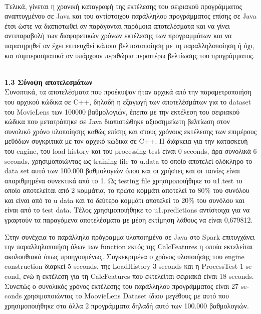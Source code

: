 \documentclass{report}
\begin{document}
\\  Τελικά, γίνεται η χρονική καταγραφή της εκτέλεσης του σειριακού προγράμματος αναπτυγμένου σε \textlatin{Java} και του αντίστοιχου παράλληλου προγράμματος επίσης σε \textlatin{Java} έτσι ώστε να διαπιστωθεί αν παράγονται παρόμοια αποτελέσματα και να γίνει αντιπαραβολή των διαφορετικών χρόνων εκτέλεσης των προγραμμάτων και να παρατηρηθεί αν έχει επιτευχθεί κάποια βελτιστοποίηση με τη παραλληλοποίηση ή όχι, και συμπερασματικά αν υπάρχουν περιθώρια περαιτέρω βελτίωσης του προγράμματος.

\vspace{25mm}
\\
\textbf{\large{1.3 Σύνοψη αποτελεσμάτων}}
\vspace{2mm}
\\
Συνοπτικά, τα αποτελέσματα που προέκυψαν ήταν αρχικά από την παραμετροποιήση του αρχικού κώδικα σε \textlatin{C++}, δηλαδή η εξαγωγή των αποτελέσμάτων για το \textlatin{dataset} του \textlatin{MovieLens} των 100000 βαθμολογιών, έπειτα με την εκτέλεση του σειριακού κώδικα που μετατράπηκε σε \textlatin{Java} διαπιστώθηκε αξιοσημείωτη βελτίωση στον συνολικό χρόνο υλοποίησης καθώς επίσης και στους χρόνους εκτέλεσης των επιμέρους μεθόδων συγκριτικά με τον αρχικό κώδικα σε \textlatin{C++}. Η διάρκεια για την κατασκευή του \textlatin{engine}, του \textlatin{load history} και του \textlatin{processing test}  είναι 0 \textlatin{seconds}, άρα συνολικά 6 \textlatin{seconds}, χρησιμοποιώντας ως \textlatin{training file} το \textlatin{u.data} το οποίο αποτελεί ολόκληρο το \textlatin{data set} αυτό των 100.000 βαθμολογιών όπου και οι χρήστες και οι ταινίες είναι απαριθμημένα συνεκτικά από το 1. Ως  \textlatin{testing file}  χρησιμοποιήθηκε το \textlatin{u1.test} το οποίο αποτελείται από 2 κομμάτια, το πρώτο κομμάτι αποτελεί το 80\% του συνόλου και είναι από το \textlatin{u data} και το δεύτερο κομμάτι αποτελεί το 20\% του συνόλου και είναι από το \textlatin{test data}. Τέλος χρησιμοποιήθηκε το \textlatin{u1.predictions} αντίστοιχα για να γραφτούν τα παραγόμενα αποτελέσματα με μέση εκτίμηση λάθους να είναι 0,679812.

Στην συνέχεια το παράλληλο πρόγραμμα υλοποιημένο σε \textlatin{Java} στο \textlatin{Spark} επιτυγχάνει την παραλληλοποιήση όλων των \textlatin{function} εκτός της \textlatin{CalcFeatures} η οποία εκτελείται ακολουθιακά όπως προηγουμένως. Συγκεκριμένα ο χρόνος υλοποιήσης του \textlatin{engine construction} διαρκεί 5 \textlatin{seconds}, της \textlatin{LoadHistory} 3 \textlatin{seconds} και η \textlatin{ProcessTest} 1 \textlatin{second}, ενώ η εκτέλεση για τη \textlatin{CalcFeatures} που εκτελείται σειριακά είναι 18 \textlatin{seconds}. Συνεπώς ο συνολικός χρόνος εκτέλεσης του παράλληλου προγράμματος είναι 27 \textlatin{seconds} χρησιμοποιώντας το \textlatin{MoovieLens Dataset} ίδιου μεγέθους με αυτό που χρησιμοποιήθηκε στα άλλα 2 προγράμματα δηλαδή αυτό των 100.000 βαθμολογιών.   
 
\end{document}
